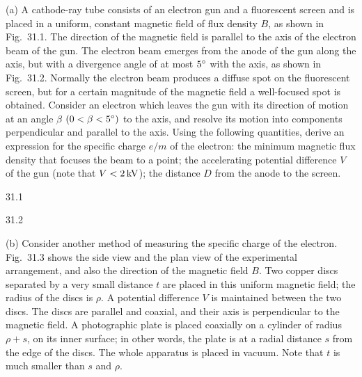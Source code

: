 (a) A cathode-ray tube consists of an electron gun and a fluorescent screen and is placed in a uniform, constant magnetic field of flux density $B$, as shown in Fig.~31.1. The direction of the magnetic field is parallel to the axis of the electron beam of the gun. The electron beam emerges from the anode of the gun along the axis, but with a divergence angle of at most $5^{\circ}$ with the axis, as shown in Fig.~31.2. Normally the electron beam produces a diffuse spot on the fluorescent screen, but for a certain magnitude of the magnetic field a well-focused spot is obtained. Consider an electron which leaves the gun with its direction of motion at an angle $\beta$ $(0<\beta<5^{\circ})$ to the axis, and resolve its motion into components perpendicular and parallel to the axis. Using the following quantities, derive an expression for the specific charge $e/m$ of the electron: the minimum magnetic flux density that focuses the beam to a point; the accelerating potential difference $V$ of the gun (note that $V<2\,\mathrm{kV}$); the distance $D$ from the anode to the screen.

\begin{figbox}{31.1}
\end{figbox}

\begin{figbox}{31.2}
\end{figbox}

(b) Consider another method of measuring the specific charge of the electron. Fig.~31.3 shows the side view and the plan view of the experimental arrangement, and also the direction of the magnetic field $B$. Two copper discs separated by a very small distance $t$ are placed in this uniform magnetic field; the radius of the discs is $\rho$. A potential difference $V$ is maintained between the two discs. The discs are parallel and coaxial, and their axis is perpendicular to the magnetic field. A photographic plate is placed coaxially on a cylinder of radius $\rho+s$, on its inner surface; in other words, the plate is at a radial distance $s$ from the edge of the discs. The whole apparatus is placed in vacuum. Note that $t$ is much smaller than $s$ and $\rho$.

